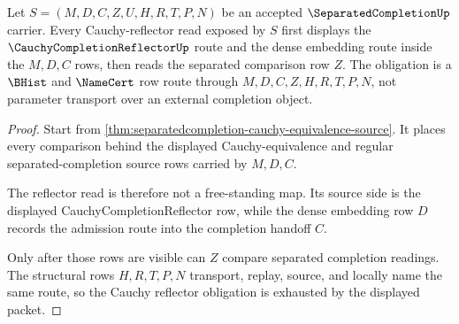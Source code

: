 \begin{theorem}
\label{thm:separatedcompletion-cauchy-reflector-obligation}
Let $S=(M,D,C,Z,U,H,R,T,P,N)$ be an accepted $\SeparatedCompletionUp$ carrier. Every Cauchy-reflector read exposed by $S$ first displays the $\CauchyCompletionReflectorUp$ route and the dense embedding route inside the $M,D,C$ rows, then reads the separated comparison row $Z$. The obligation is a $\BHist$ and $\NameCert$ row route through $M,D,C,Z,H,R,T,P,N$, not parameter transport over an external completion object.
\end{theorem}
\begin{proof}
Start from \autoref{thm:separatedcompletion-cauchy-equivalence-source}. It places every comparison behind the displayed Cauchy-equivalence and regular separated-completion source rows carried by $M,D,C$.

The reflector read is therefore not a free-standing map. Its source side is the displayed CauchyCompletionReflector row, while the dense embedding row $D$ records the admission route into the completion handoff $C$.

Only after those rows are visible can $Z$ compare separated completion readings. The structural rows $H,R,T,P,N$ transport, replay, source, and locally name the same route, so the Cauchy reflector obligation is exhausted by the displayed packet.
\end{proof}

